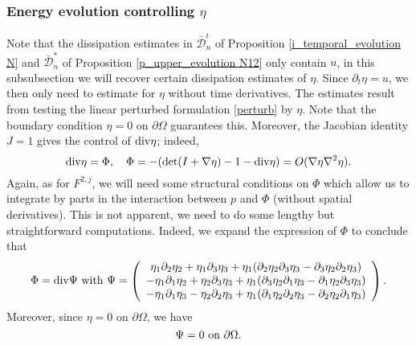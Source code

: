 \documentclass[a4paper,reqno,11pt]{amsart}
\numberwithin{equation}{section}
\begin{document}
\subsubsection{Energy evolution controlling $\eta$}

Note that the dissipation estimates in $\bar{\mathcal{D}}_n^t$ of Proposition \ref{i_temporal_evolution  N} and $\bar{\mathcal{D}}_n^\ast$ of Proposition \ref{p_upper_evolution  N12} only contain $u$, in this subsubsection we will recover certain dissipation estimates of $\eta$. Since ${\partial_t} \eta =u$, we then only need to estimate for $\eta$ without time derivatives. The estimates result from testing the linear perturbed formulation \eqref{perturb} by $\eta$. Note that the boundary condition $\eta=0$ on ${\partial}\Omega$ guarantees this. Moreover, the Jacobian identity $J=1$ gives the control of ${\rm div}\eta$;
indeed,
\begin{equation}\label{phhicon}
{\rm div}\eta=\Phi,\quad \Phi=-({\rm det} (I+\nabla\eta)-1-{\rm div}\eta)=O(\nabla\eta\nabla^2\eta).
\end{equation}
Again, as for $F^{2,j}$, we will need some structural
conditions on $\Phi$ which allow us to integrate by parts in the interaction between $p$ and $\Phi$ (without spatial derivatives). This is not apparent, we need to do some lengthy but straightforward computations. Indeed, we expand the expression of $\Phi$ to conclude that
 \begin{equation}\label{Qstr2}
\Phi= {\rm div}\Psi \text{ with }
\Psi= \left(\begin{array}{ccc}\eta_1{\partial}_2\eta_2+\eta_1{\partial}_3\eta_3+\eta_1({\partial}_2\eta_2{\partial}_3\eta_3-{\partial}_3\eta_2{\partial}_2\eta_3)
\\-\eta_1{\partial}_1\eta_2+\eta_2{\partial}_3\eta_3+\eta_1({\partial}_3\eta_2{\partial}_1\eta_3-{\partial}_1\eta_2{\partial}_3\eta_3)
\\-\eta_1{\partial}_1\eta_3-\eta_2{\partial}_2\eta_3+\eta_1({\partial}_1\eta_2{\partial}_2\eta_3-{\partial}_2\eta_2{\partial}_1\eta_3)
\end{array}\right).
 \end{equation}
Moreover, since $\eta=0$ on ${\partial}\Omega$, we have
\begin{equation}\label{Qstr111}
 \Psi=0\hbox{ on }{\partial}\Omega.
\end{equation}
\end{document}
